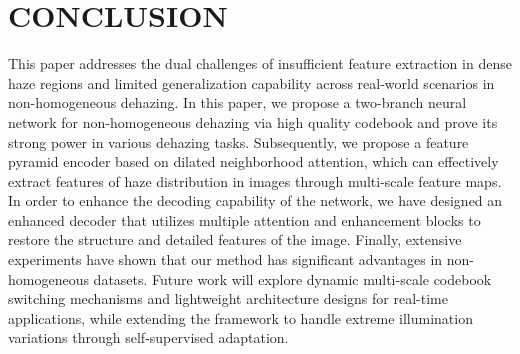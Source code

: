 \documentclass[journal]{IEEEtran}
\begin{document}
\section{CONCLUSION}
This paper addresses the dual challenges of insufficient feature extraction in dense haze regions and limited generalization capability across real-world scenarios in non-homogeneous dehazing.  In this paper, we propose a two-branch neural network for non-homogeneous dehazing via high quality codebook and prove its strong power in various dehazing tasks. Subsequently, we propose a feature pyramid encoder based on dilated neighborhood attention, which can effectively extract features of haze distribution in images through multi-scale feature maps. In order to enhance the decoding capability of the network, we have designed an enhanced decoder that utilizes multiple attention and enhancement blocks to restore the structure and detailed features of the image. Finally, extensive experiments have shown that our method has significant advantages in non-homogeneous datasets. Future work will explore dynamic multi-scale codebook switching mechanisms and lightweight architecture designs for real-time applications, while extending the framework to handle extreme illumination variations through self-supervised adaptation.



{}
\end{document}
